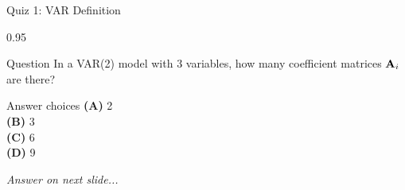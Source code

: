 \documentclass[9pt, aspectratio=169, t]{beamer}
\begin{document}
\begin{frame}{Quiz 1: VAR Definition}
    \begin{cminipage}{0.95\textwidth}
    \begin{alertblock}{Question}
        In a VAR(2) model with 3 variables, how many coefficient matrices $\mathbf{A}_i$ are there?
    \end{alertblock}

    \vspace{0.4cm}

    \begin{block}{Answer choices}
        \textcolor{MainBlue}{\textbf{(A)}} 2\\[3pt]
        \textcolor{MainBlue}{\textbf{(B)}} 3\\[3pt]
        \textcolor{MainBlue}{\textbf{(C)}} 6\\[3pt]
        \textcolor{MainBlue}{\textbf{(D)}} 9
    \end{block}

    \vspace{0.5cm}

    \begin{center}
        \textit{Answer on next slide...}
    \end{center}
    \end{cminipage}
\end{frame}
\end{document}
